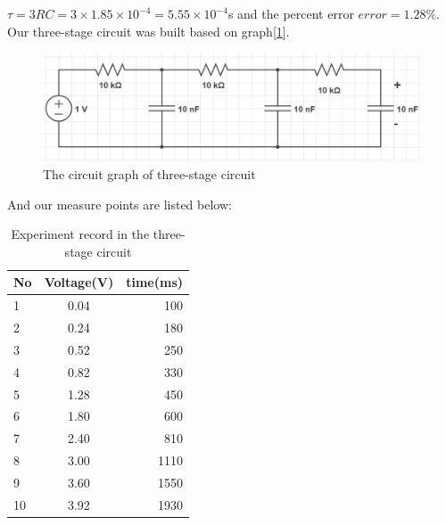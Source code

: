 $\tau = 3RC = 3\times1.85\times10^{-4} = 5.55\times10^{-4}$s and the percent error $error = 1.28\%$.\\
\phantom{ } Our three-stage circuit was built based on graph[\ref{fig:2.4}].\\
\begin{figure}[!htbp]
	\centering %
	\includegraphics[width=\linewidth]{images/2_4.PNG} %
	\caption{The circuit graph of three-stage circuit} %
	\label{fig:2.4} %
\end{figure}
\phantom{ }And our measure points are listed below:\\
\begin{table}[!htbp]\centering
	\caption{Experiment record in the three-stage circuit}
	\renewcommand\arraystretch{1.5}
	\begin{tabular}{lcr}
		\toprule
		No		&Voltage(V)	&time(ms)	\\
		\midrule
		1		&0.04		&100		\\
		
		2		&0.24		&180		\\
		
		3		&0.52		&250		\\
		
		4		&0.82		&330		\\
		
		5		&1.28		&450		\\
		
		6		&1.80		&600		\\
		
		7		&2.40		&810		\\
		
		8		&3.00		&1110		\\
		
		9		&3.60		&1550		\\
		
		10		&3.92		&1930		\\
		\bottomrule
	\end{tabular}
\end{table}
